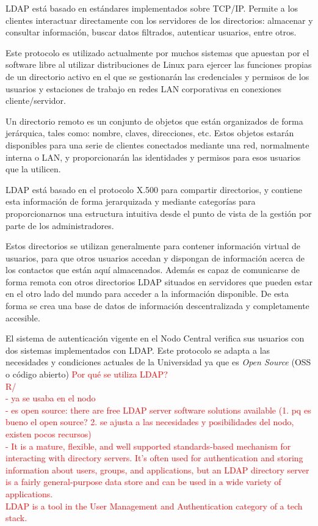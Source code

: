 LDAP está basado en estándares implementados sobre TCP/IP. Permite a los clientes interactuar directamente con los servidores de los directorios: almacenar y consultar información, buscar datos filtrados, autenticar usuarios, entre otros.

Este protocolo es utilizado actualmente por muchos sistemas que apuestan por el software libre al utilizar distribuciones de Linux para ejercer las funciones propias de un directorio activo en el que se gestionarán las credenciales y permisos de los usuarios y estaciones de trabajo en redes LAN corporativas en conexiones cliente/servidor.

Un directorio remoto es un conjunto de objetos que están organizados de forma jerárquica, tales como: nombre, claves, direcciones, etc. Estos objetos estarán disponibles para una serie de clientes conectados mediante una red, normalmente interna o LAN, y proporcionarán las identidades y permisos para esos usuarios que la utilicen.

LDAP está basado en el protocolo X.500 para compartir directorios, y contiene esta información de forma jerarquizada y mediante categorías para proporcionarnos una estructura intuitiva desde el punto de vista de la gestión por parte de los administradores.

Estos directorios se utilizan generalmente para contener información virtual de usuarios, para que otros usuarios accedan y dispongan de información acerca de los contactos que están aquí almacenados. Además es capaz de comunicarse de forma remota con otros directorios LDAP situados en servidores que pueden estar en el otro lado del mundo para acceder a la información disponible. De esta forma se crea una base de datos de información descentralizada y completamente accesible.
 
El sistema de autenticación vigente en el Nodo Central verifica sus usuarios con dos sistemas implementados con LDAP. Este protocolo se adapta a las necesidades y condiciones actuales de la Universidad ya que es \textit{Open Source} (OSS o código abierto)
\textcolor{red}{Por qué se utiliza LDAP? \\ 
	R/ \\
	- ya se usaba en el nodo \\
	- es open source: there are free LDAP server software solutions available (1. pq es bueno el open source? 2. se ajusta a las necesidades y posibilidades del nodo, existen pocos recursos) \\
	- It is a mature, flexible, and well supported standards-based mechanism for interacting with directory servers. It’s often used for authentication and storing information about users, groups, and applications, but an LDAP directory server is a fairly general-purpose data store and can be used in a wide variety of applications. \\ LDAP is a tool in the User Management and Authentication category of a tech stack.}




